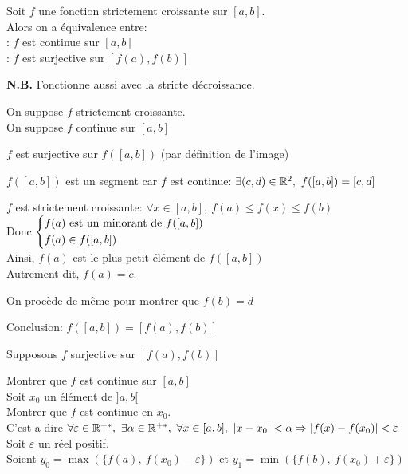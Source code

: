 \documentclass[12pt,twoside,a4paper]{article}
\begin{document}
		\begin{prop}
			Soit $f$ une fonction strictement croissante sur $[a,b]$.\\
			Alors on a \'equivalence entre:\\
			: $f$ est continue sur $[a,b]$\\
			: $f$ est surjective sur $[f(a),f(b)]$
		\end{prop}
		\begin{flushleft}
			\textbf{N.B.} Fonctionne aussi avec la stricte d\'ecroissance.
		\end{flushleft}
		\begin{preuve}
			On suppose $f$ strictement croissante.\\
			 On suppose $f$ continue sur $[a,b]$
			\begin{tab}
				$f$ est surjective sur $f([a,b])$ (par d\'efinition de l'image)
				\begin{liste}
					\item $f([a,b])$ est un segment car $f$ est continue: $\exists(c,d)\in\R^{2},\ f([a,b])=[c,d]$
					\item $f$ est strictement croissante: $\forall x\in [a,b],\ f(a)\leqslant f(x)\leqslant f(b)$\\
						Donc $\left\{\begin{aligned}& f(a)\text{ est un minorant de }f([a,b])\\& f(a)\in f([a,b])\end{aligned}\right.$\\
						Ainsi, $f(a)$ est le plus petit \'el\'ement de $f([a,b])$\\
						Autrement dit, $f(a)=c$.
					\item On proc\`ede de m\^eme pour montrer que $f(b)=d$
				\end{liste}
				Conclusion: $f([a,b])=[f(a),f(b)]$
			\end{tab}
			 Supposons $f$ surjective sur $[f(a),f(b)]$
			\begin{tab}
				Montrer que $f$ est continue sur $[a,b]$\\
				Soit $x_0$ un \'el\'ement de $]a,b[$\\
				Montrer que $f$ est continue en $x_0$.\\
				C'est a dire $\forall \varepsilon\in\R^{+*},\ \exists \alpha\in\R^{+*},\ \forall x\in[a,b],\ |x-x_0|<\alpha\Rightarrow|f(x)-f(x_0)|<\varepsilon$\\
				Soit $\varepsilon$ un r\'eel positif.\\
				Soient $y_0=\max(\{f(a),\ f(x_0)-\varepsilon \})$ et $y_1=\min(\{f(b),\ f(x_0)+\varepsilon \})$\\

\end{tab}
\end{preuve}
\end{document}
